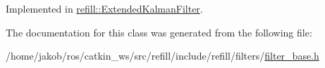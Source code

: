 Implemented in \hyperlink{classrefill_1_1ExtendedKalmanFilter_a7d498bfa574e87ef06c30df91d74b8ea}{refill\+::\+Extended\+Kalman\+Filter}.



The documentation for this class was generated from the following file\+:\begin{DoxyCompactItemize}
\item 
/home/jakob/ros/catkin\+\_\+ws/src/refill/include/refill/filters/\hyperlink{filter__base_8h}{filter\+\_\+base.\+h}\end{DoxyCompactItemize}
